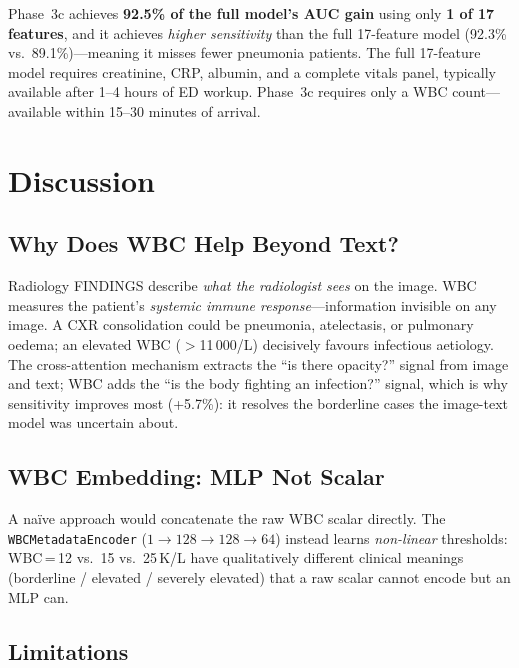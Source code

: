 \documentclass{article}
\begin{document}
Phase~3c achieves \textbf{92.5\% of the full model's AUC gain} using only
\textbf{1 of 17 features}, and it achieves \emph{higher sensitivity}
than the full 17-feature model (92.3\% vs.\ 89.1\%)---meaning it misses
fewer pneumonia patients.
The full 17-feature model requires creatinine, CRP, albumin, and a complete
vitals panel, typically available after 1--4 hours of ED workup.
Phase~3c requires only a WBC count---available within 15--30 minutes of arrival.

\section{Discussion}

\subsection{Why Does WBC Help Beyond Text?}

Radiology FINDINGS describe \emph{what the radiologist sees} on the image.
WBC measures the patient's \emph{systemic immune response}---information
invisible on any image. A CXR consolidation could be pneumonia, atelectasis,
or pulmonary oedema; an elevated WBC ($>$11\,000/\textmu{}L) decisively favours
infectious aetiology. The cross-attention mechanism extracts the
``is there opacity?'' signal from image and text; WBC adds the
``is the body fighting an infection?'' signal, which is why sensitivity
improves most (+5.7\%): it resolves the borderline cases the image-text
model was uncertain about.

\subsection{WBC Embedding: MLP Not Scalar}

A na{\"i}ve approach would concatenate the raw WBC scalar directly.
The \texttt{WBCMetadataEncoder} ($1\!\to\!128\!\to\!128\!\to\!64$) instead learns
\emph{non-linear} thresholds: WBC\,=\,12 vs.\ 15 vs.\ 25\,K/\textmu{}L have
qualitatively different clinical meanings (borderline / elevated / severely elevated)
that a raw scalar cannot encode but an MLP can.

\subsection{Limitations}
\end{document}
